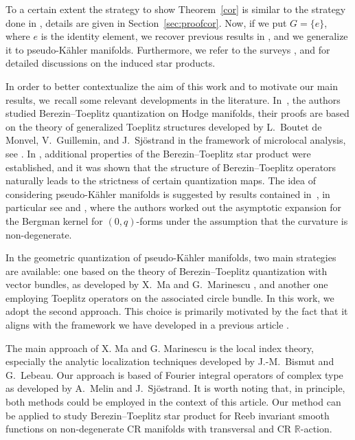 \documentclass[10pt,a4paper]{amsart}
\numberwithin{equation}{section}
\begin{document}
To a certain extent the strategy to show Theorem~\ref{cor} is similar to the strategy done in \cite{schl1}, details are given in Section~\ref{sec:proofcor}. Now, if we put $G=\{e\}$, where $e$ is the identity element, we recover previous results in \cite{schl1}, and we generalize it to pseudo-K\"ahler manifolds. Furthermore, we refer to the surveys \cite{ks,schl2}, and \cite{w} for detailed discussions on the induced star products.
	
In order to better contextualize the aim of this work and to motivate our main results, we~recall some relevant developments in the literature. In~\cite{bms}, the authors studied Berezin--Toeplitz quantization on Hodge manifolds, their proofs are based on the theory of generalized Toeplitz structures developed by L.~Boutet de Monvel, V.~Guillemin, and J.~Sj\"ostrand in the framework of microlocal analysis, see \cite{boutet-guillemin}. In \cite{schl2}, additional properties of the Berezin--Toeplitz star product were established, and it was shown that the structure of Berezin--Toeplitz operators naturally leads to the strictness of certain quantization maps. The idea of considering pseudo-K\"ahler manifolds is suggested by results contained in~\cite{hsma,mm}, in particular see \cite[Theorem~1.7]{mm06} and \cite[Section~8.2]{mm}, where the authors worked out the asymptotic expansion for the Bergman kernel for $(0,q)$-forms under the assumption that the curvature is non-degenerate.
	
In the geometric quantization of pseudo-K\"ahler manifolds, two main strategies are available: one based on the theory of Berezin--Toeplitz quantization with vector bundles, as developed by X.~Ma and G.~Marinescu \cite{mm}, and another one employing Toeplitz operators on the associated circle bundle. In this work, we adopt the second approach. This choice is primarily motivated by the fact that it aligns with the framework we have developed in a previous article \cite{gh}.
	 	
The main approach of X. Ma and G. Marinescu is the local index theory, especially the analytic localization techniques developed by J.-M.~Bismut and G.~Lebeau. Our approach is based of Fourier integral operators of complex type as developed by A.~Melin and J.~Sj\"ostrand. It is worth noting that, in principle, both methods could be employed in the context of this article. Our method can be applied to study Berezin--Toeplitz star product for Reeb invariant smooth functions on non-degenerate CR manifolds with transversal and CR $\mathbb R$-action.
\end{document}
